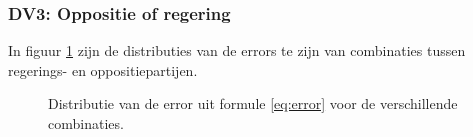 \subsubsection{DV3: Oppositie of regering}
In figuur \ref{fig:distributies} zijn de distributies van de errors te zijn van combinaties tussen regerings- en oppositiepartijen.
\begin{figure}[H]
    \centering
    \hspace*{-0.2in}
    \quad
    \hspace*{-0.2in}
    \quad
    \caption{Distributie van de error uit formule \ref{eq:error} voor de verschillende combinaties.}%
    \label{fig:distributies}%
\end{figure}

